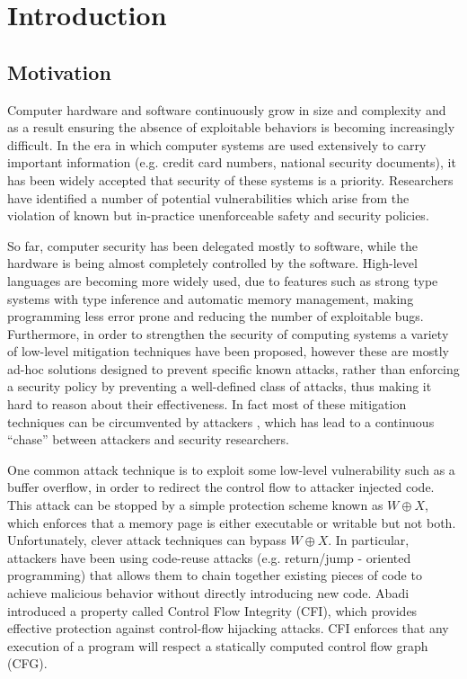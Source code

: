 \chapter{Introduction}\label{ch:introduction}

\section{Motivation}\label{sec:motivation}

Computer hardware and software continuously grow in size and complexity and as a
result ensuring the absence of exploitable behaviors is becoming increasingly
difficult. In the era in which computer systems are used extensively to
carry important information (e.g. credit card numbers, national security
documents), it has been widely accepted that security of these systems is a
priority. Researchers have identified a number of potential vulnerabilities
which arise from the violation of known but in-practice unenforceable safety
and security policies.

So far, computer security has been delegated mostly to software, while
the hardware is being almost completely controlled by the software.
High-level languages are becoming more widely used, due to features
such as strong type systems with type inference and automatic memory
management, making programming less error prone and reducing the
number of exploitable bugs. Furthermore, in order to strengthen the
security of computing systems a variety of low-level mitigation
techniques \cite{Cowan:1998:SAA:1267549.1267554,PaX,Erlingsson07}
have been proposed, however these are mostly ad-hoc solutions designed
to prevent specific known attacks, rather than enforcing a security
policy by preventing a well-defined class of attacks, thus making it
hard to reason about their effectiveness. In fact most of these
mitigation techniques can be circumvented by attackers
\cite{Szekeres2013}, which has lead to a continuous ``chase'' between
attackers and security researchers.

One common attack technique is to exploit some low-level vulnerability
such as a buffer overflow, in order to redirect the control flow to
attacker injected code. This attack can be stopped by a simple
protection scheme known as $W \oplus X$, which enforces that a memory
page is either executable or writable but not both.  Unfortunately,
clever attack techniques can bypass $W \oplus X$. In particular,
attackers have been using code-reuse attacks (e.g. return/jump -
oriented programming) that allows them to chain together existing
pieces of code to achieve malicious behavior without directly
introducing new code.  Abadi~\ETAL\cite{abadi2005} introduced a
property called Control Flow Integrity (CFI), which provides effective
protection against control-flow hijacking attacks.  CFI enforces that
any execution of a program will respect a statically computed control
flow graph (CFG).  


